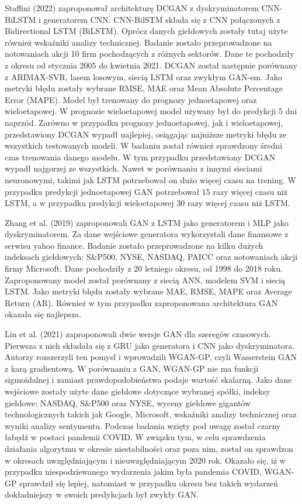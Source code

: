 \documentclass[11pt]{article} %
\begin{document}
Staffini (2022) zaproponował architekturę DCGAN z dyskryminatorem CNN-BiLSTM i generatorem CNN. CNN-BilSTM składa się z CNN połączonych z Bidirectional LSTM (BiLSTM). Oprócz danych giełdowych zostały tutaj użyte również wskaźniki analizy technicznej. Badanie zostało przeprowadzone na notowaniach akcji 10 firm pochodzących z różnych sektorów. Dane te pochodziły z okresu od stycznia 2005 do kwietnia 2021. DCGAN został następnie porównany z ARIMAX-SVR, lasem losowym, siecią LSTM oraz zwykłym GAN-em. Jako metryki błędu zostały wybrane RMSE, MAE oraz Mean Absolute Percentage Error (MAPE). Model był trenowany do prognozy jednoetapowej oraz wieloetapowej. W prognozie wieloetapowej model używany był do predykcji 5 dni naprzód. Zarówno w przypadku prognozy jednoetapowej, jak i wieloetapowej, przedstawiony DCGAN wypadł najlepiej, osiągając najniższe metryki błędu ze wszystkich testowanych modeli. W badaniu został również sprawdzony średni czas trenowania danego modelu. W tym przypadku przedstawiony DCGAN wypadł najgorzej ze wszystkich.  Nawet w porównaniu z innymi sieciami neuronowymi, takimi jak LSTM potrzebował on dużo więcej czasu na trening. W przypadku predykcji jednoetapowej GAN potrzebował 15 razy więcej czasu niż LSTM, a w przypadku predykcji wieloetapowej 30 razy więcej czasu niż LSTM. 

Zhang et al. (2019) zaproponowali GAN z LSTM jako generatorem i MLP jako dyskryminatorem. Za dane wejściowe generatora wykorzystali dane finansowe z serwisu yahoo finance. Badanie zostało przeprowadzone na kilku dużych indeksach giełdowych: S\&P500, NYSE, NASDAQ, PAICC oraz notowaniach akcji firmy Microsoft. Dane pochodziły z 20 letniego okresu, od 1998 do 2018 roku. Zaproponowany model został porównany z siecią ANN, modelem SVM i siecią LSTM. Jako metryki błędu zostały wybrane MAE, RMSE, MAPE oraz Average Return (AR). Również w tym przypadku zaproponowana architektura GAN okazała się najlepsza. 

Lin et al. (2021) zaproponowali dwie wersje GAN dla szeregów czasowych. Pierwsza z nich składała się z GRU jako generatora i CNN jako dyskryminatora. Autorzy rozszerzyli ten pomysł i wprowadzili WGAN-GP, czyli Wasserstein GAN z karą gradientową. W porównaniu z GAN, WGAN-GP nie ma funkcji sigmoidalnej i zamiast prawdopodobieństwa podaje wartość skalarną. Jako dane wejściowe zostały użyte dane giełdowe dotyczące wybranej spółki, indeksy giełdowe: NASDAQ, S\&P500 oraz NYSE, wyceny giełdowe gigantów technologicznych takich jak Google, Microsoft, wskaźniki analizy technicznej oraz wyniki analizy sentymentu. Podczas badania wzięty pod uwagę został czarny łabędź w postaci pandemii COVID. W związku tym, w celu sprawdzenia działania algorytmu w okresie niestabilności oraz poza nim, został on sprawdzon w okresach uwzględniającym i nieuwzględniającym 2020 rok. Okazało się, iż w przypadku niespodziewanego wydarzenia jakim była pandemia COVID, WGAN-GP sprawdził się lepiej, natomiast w przypadku okresu bez takich wydarzeń dokładniejszy w swoich predykcjach był zwykły GAN.
\end{document}
